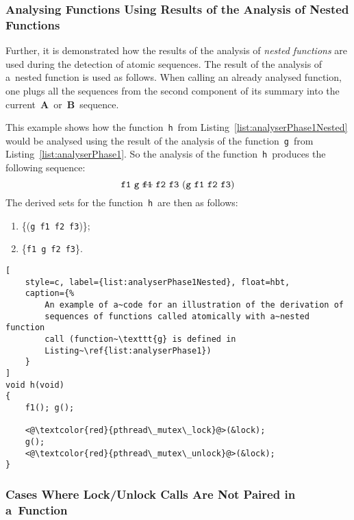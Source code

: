 \subsubsection{%
    Analysing Functions Using Results of the Analysis of Nested Functions
}

Further, it is demonstrated how the results of the analysis of \emph{nested
functions} are used during the detection of atomic sequences. The
result of the analysis of a~nested function is used as follows. When
calling an already analysed function, one plugs all the sequences from the
second component of its summary into the
current~\textbf{A}~or~\textbf{B}~sequence.

\begin{example}
    This example shows how the function~\texttt{h}~from
    Listing~\ref{list:analyserPhase1Nested} would be analysed using the
    result of the analysis of the function~\texttt{g}~from
    Listing~\ref{list:analyserPhase1}. So the analysis of the
    function~\texttt{h}~produces the following sequence:
    $$
        \text{%
            \texttt{f1}~\texttt{g}~\sout{\texttt{f1}}~\texttt{f2}~\texttt{f3}
        }
        (\text{%
            \texttt{g}~\texttt{f1}~\texttt{f2}~\texttt{f3}%
        })
    $$
    The derived sets for the function~\texttt{h}~are then as follows:
    \begin{enumerate}[label={(\roman*)}]
        \item
            \{(\texttt{g}~\texttt{f1}~\texttt{f2}~\texttt{f3})\};

        \item
            \{\texttt{f1}~\texttt{g}~\texttt{f2}~\texttt{f3}\}.
    \end{enumerate}
\end{example}

\begin{lstlisting}[
    style=c, label={list:analyserPhase1Nested}, float=hbt,
    caption={%
        An example of a~code for an illustration of the derivation of
        sequences of functions called atomically with a~nested function
        call (function~\texttt{g} is defined in
        Listing~\ref{list:analyserPhase1})
    }
]
void h(void)
{
    f1(); g();

    <@\textcolor{red}{pthread\_mutex\_lock}@>(&lock);
    g();
    <@\textcolor{red}{pthread\_mutex\_unlock}@>(&lock);
}
\end{lstlisting}

\subsubsection{Cases Where Lock/Unlock Calls Are Not Paired in a~Function}


